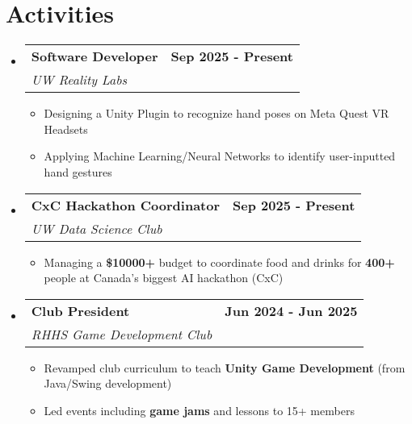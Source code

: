 \documentclass[letterpaper,11pt]{article}
\makeatletter
\newcommand{\resumeItem}[1]{
  \item\small{
    {#1 \vspace{-2pt}}
  }
}
\newcommand{\resumeSubheading}[4]{
  \vspace{-2pt}\item
    \begin{tabular*}{1.0\textwidth}[t]{l@{\extracolsep{\fill}}r}
      \textbf{#1} & \textbf{\small #2} \\
      \textit{\small#3} & \textit{\small #4} \\
    \end{tabular*}\vspace{-7pt}
}
\newcommand{\resumeSubHeadingListStart}{\begin{itemize}[leftmargin=0.0in, label={}]}
\newcommand{\resumeSubHeadingListEnd}{\end{itemize}}
\newcommand{\resumeItemListStart}{\begin{itemize}}
\newcommand{\resumeItemListEnd}{\end{itemize}\vspace{-5pt}}
\makeatother
\begin{document}
\section{Activities}
\resumeSubHeadingListStart
    \resumeSubheading
    {\textbf{Software Developer} } {Sep 2025 - Present}
    {UW Reality Labs}{}
    \resumeItemListStart
        \resumeItem{Designing a Unity Plugin to recognize hand poses on Meta Quest VR Headsets}
        \resumeItem{Applying Machine Learning/Neural Networks to identify user-inputted hand gestures}
    \resumeItemListEnd
    \resumeSubheading
    {\textbf{CxC Hackathon Coordinator} } {Sep 2025 - Present}
    {UW Data Science Club}{}
    \resumeItemListStart
        \resumeItem{Managing a \textbf{\$10000+} budget to coordinate food and drinks for \textbf{400+} people at Canada's biggest AI hackathon (CxC)}
    \resumeItemListEnd
    \resumeSubheading
    {Club President} {Jun 2024 - Jun 2025}
    {RHHS Game Development Club}{}
    \resumeItemListStart
        \resumeItem{Revamped club curriculum to teach \textbf{Unity Game Development} (from Java/Swing development)}
        \resumeItem{Led events including \textbf{game jams} and lessons to 15+ members}
    \resumeItemListEnd
\resumeSubHeadingListEnd
\vspace{-16pt}

\end{document}
